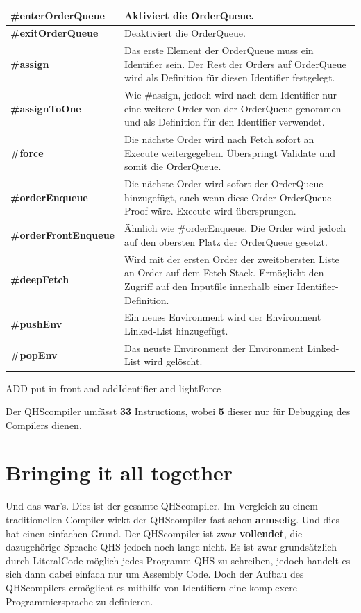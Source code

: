 \begin{table}[H]
    \centering
    \begin{tabularx}{\textwidth}{l|X}
    \textbf{\#enterOrderQueue}      & Aktiviert die OrderQueue. \\ \hline
    \textbf{\#exitOrderQueue}       & Deaktiviert die OrderQueue. \\ \hline
    \textbf{\#assign}               & Das erste Element der OrderQueue muss ein Identifier sein. Der Rest der Orders auf OrderQueue wird als Definition für diesen Identifier festgelegt. \\ \hline
    \textbf{\#assignToOne}          & Wie \#assign, jedoch wird nach dem Identifier nur eine weitere Order von der OrderQueue genommen und als Definition für den Identifier verwendet. \\ \hline
    \textbf{\#force}                & Die nächste Order wird nach Fetch sofort an Execute weitergegeben. Überspringt Validate und somit die OrderQueue. \\ \hline
    \textbf{\#orderEnqueue}         & Die nächste Order wird sofort der OrderQueue hinzugefügt, auch wenn diese Order OrderQueue-Proof wäre. Execute wird übersprungen. \\ \hline
    \textbf{\#orderFrontEnqueue}    & Ähnlich wie \#orderEnqueue. Die Order wird jedoch auf den obersten Platz der OrderQueue gesetzt. \\ \hline
    \textbf{\#deepFetch}            & Wird mit der ersten Order der zweitobersten Liste an Order auf dem Fetch-Stack. Ermöglicht den Zugriff auf den Inputfile innerhalb einer Identifier-Definition. \\ \hline
    \textbf{\#pushEnv}              & Ein neues Environment wird der Environment Linked-List hinzugefügt. \\ \hline
    \textbf{\#popEnv}               & Das neuste Environment der Environment Linked-List wird gelöscht.
        
    \end{tabularx}
\end{table}

ADD put in front and addIdentifier and lightForce

Der QHScompiler umfässt \textbf{33} Instructions, wobei \textbf{5} dieser nur für Debugging des Compilers dienen.

\section{Bringing it all together}
Und das war's. Dies ist der gesamte QHScompiler. Im Vergleich zu einem traditionellen Compiler wirkt der QHScompiler fast schon \textbf{armselig}. Und dies hat einen einfachen Grund. Der QHScompiler ist zwar \textbf{vollendet},
die dazugehörige Sprache QHS jedoch noch lange nicht. Es ist zwar grundsätzlich durch LiteralCode möglich jedes Programm QHS zu schreiben, jedoch handelt es sich dann dabei einfach nur um Assembly Code.
Doch der Aufbau des QHScompilers ermöglicht es mithilfe von Identifiern eine komplexere Programmiersprache zu definieren.

